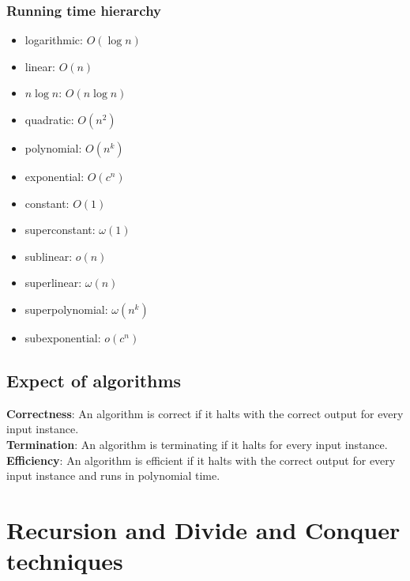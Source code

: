 \documentclass[onecolumn]{report}
\begin{document}
\subsection{Running time hierarchy}
\begin{itemize}
    \item logarithmic: $O(\log n)$
    \item linear: $O(n)$
    \item $n\log n$: $O(n\log n)$
    \item quadratic: $O(n^2)$
    \item polynomial: $O(n^k)$
    \item exponential: $O(c^n)$
    \item constant: $O(1)$
    \item superconstant: $\omega (1)$
    \item sublinear: $o(n)$
    \item superlinear: $\omega (n)$
    \item superpolynomial: $\omega (n^k)$
    \item subexponential: $o(c^n)$
\end{itemize}

\section{Expect of algorithms}
\textbf{Correctness}: An algorithm is correct if it halts with the correct output for every input instance.\\
\textbf{Termination}: An algorithm is terminating if it halts for every input instance.\\
\textbf{Efficiency}: An algorithm is efficient if it halts with the correct output for every input instance and runs in polynomial time.\\

\chapter{Recursion and Divide and Conquer techniques}
\end{document}
